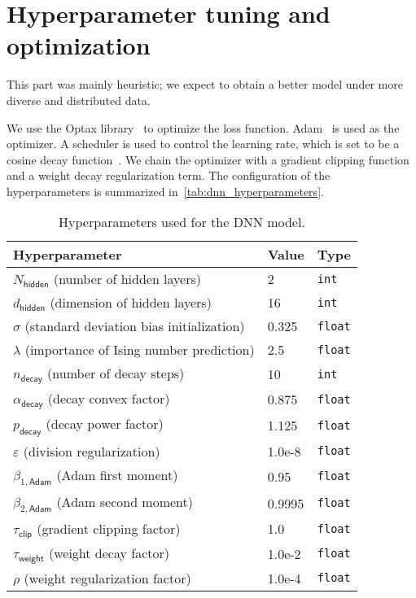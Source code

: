 \documentclass{psu-report}
\begin{document}
\section{Hyperparameter tuning and optimization}
\label{sec:hyperparameter_tuning}

This part was mainly heuristic; we expect to obtain a better model under
more diverse and distributed data.

We use the Optax library~\autocite{2020Optax-1} to optimize the loss function.
Adam~\autocite{2014Kin-1} is used as the optimizer.
A scheduler is used to control the learning rate, which is set to
be a cosine decay function~\autocite{2016LosHut-1}.
We chain the optimizer with a gradient clipping function and a weight decay
regularization term.
The configuration of the hyperparameters is summarized
in~\autoref{tab:dnn_hyperparameters}.

\begin{table}[htbp]
    \centering
    \begin{tabular}{lll}
        \hline
        \textbf{Hyperparameter} & \textbf{Value} & \textbf{Type} \\
        \hline
        \(N_\mathsf{hidden}\) (number of hidden layers) &
        2 & \texttt{int} \\
        \(d_\mathsf{hidden}\) (dimension of hidden layers) &
        16 & \texttt{int} \\
        \(\sigma\) (standard deviation bias initialization) &
        0.325 & \texttt{float} \\
        \(\lambda\) (importance of Ising number prediction) &
        2.5 & \texttt{float} \\
        \(n_\mathsf{decay}\) (number of decay steps) &
        10 & \texttt{int} \\
        \(\alpha_\mathsf{decay}\) (decay convex factor) &
        0.875 & \texttt{float} \\
        \(p_\mathsf{decay}\) (decay power factor) &
        1.125 & \texttt{float} \\
        \(\varepsilon\) (division regularization) &
        1.0e-8 & \texttt{float} \\
        \(\beta_{1,\mathsf{Adam}}\) (Adam first moment) &
        0.95 & \texttt{float} \\
        \(\beta_{2,\mathsf{Adam}}\) (Adam second moment) &
        0.9995 & \texttt{float} \\
        \(\tau_\mathsf{clip}\) (gradient clipping factor) &
        1.0 & \texttt{float} \\
        \(\tau_\mathsf{weight}\) (weight decay factor) &
        1.0e-2 & \texttt{float} \\
        \(\rho\) (weight regularization factor) &
        1.0e-4 & \texttt{float} \\
        \hline
    \end{tabular}
    \caption{Hyperparameters used for the DNN model.}
    \label{tab:dnn_hyperparameters}
\end{table}
\end{document}
